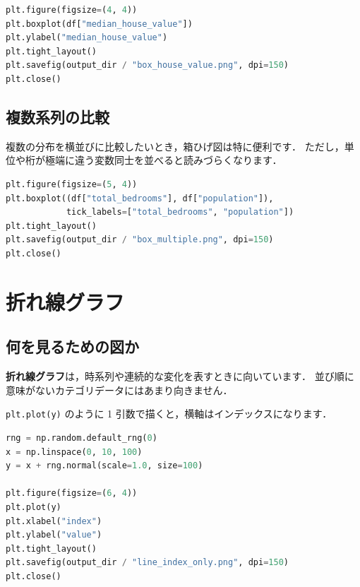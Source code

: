 \begin{lstlisting}[style=codecell,language=Python]
plt.figure(figsize=(4, 4))
plt.boxplot(df["median_house_value"])
plt.ylabel("median_house_value")
plt.tight_layout()
plt.savefig(output_dir / "box_house_value.png", dpi=150)
plt.close()
\end{lstlisting}


\subsection{複数系列の比較}

複数の分布を横並びに比較したいとき，箱ひげ図は特に便利です．
ただし，単位や桁が極端に違う変数同士を並べると読みづらくなります．

\begin{lstlisting}[style=codecell,language=Python]
plt.figure(figsize=(5, 4))
plt.boxplot((df["total_bedrooms"], df["population"]),
            tick_labels=["total_bedrooms", "population"])
plt.tight_layout()
plt.savefig(output_dir / "box_multiple.png", dpi=150)
plt.close()
\end{lstlisting}



\section{折れ線グラフ}

\subsection{何を見るための図か}

\textbf{折れ線グラフ}は，時系列や連続的な変化を表すときに向いています．
並び順に意味がないカテゴリデータにはあまり向きません．

\texttt{plt.plot(y)} のように 1 引数で描くと，横軸はインデックスになります．

\begin{lstlisting}[style=codecell,language=Python]
rng = np.random.default_rng(0)
x = np.linspace(0, 10, 100)
y = x + rng.normal(scale=1.0, size=100)

plt.figure(figsize=(6, 4))
plt.plot(y)
plt.xlabel("index")
plt.ylabel("value")
plt.tight_layout()
plt.savefig(output_dir / "line_index_only.png", dpi=150)
plt.close()
\end{lstlisting}

